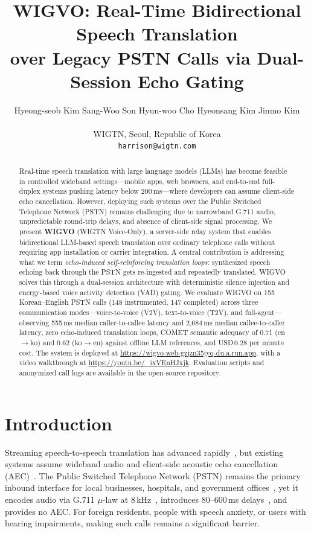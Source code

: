 \documentclass[11pt]{article}
\title{WIGVO: Real-Time Bidirectional Speech Translation\\over Legacy PSTN Calls via Dual-Session Echo Gating}
\author{
  Hyeong-seob Kim \quad
  Sang-Woo Son \quad
  Hyun-woo Cho \quad
  Hyeonsang Kim \quad
  Jinmo Kim \\
  \\
  WIGTN, Seoul, Republic of Korea \\
  \texttt{harrison@wigtn.com}
}
\begin{document}
\maketitle

\begin{abstract}
Real-time speech translation with large language models (LLMs) has become feasible in controlled wideband settings---mobile apps, web browsers, and end-to-end full-duplex systems pushing latency below 200\,ms---where developers can assume client-side echo cancellation. However, deploying such systems over the Public Switched Telephone Network (PSTN) remains challenging due to narrowband G.711 audio, unpredictable round-trip delays, and absence of client-side signal processing. We present \textbf{WIGVO} (WIGTN Voice-Only), a server-side relay system that enables bidirectional LLM-based speech translation over ordinary telephone calls without requiring app installation or carrier integration. A central contribution is addressing what we term \emph{echo-induced self-reinforcing translation loops}: synthesized speech echoing back through the PSTN gets re-ingested and repeatedly translated. WIGVO solves this through a dual-session architecture with deterministic silence injection and energy-based voice activity detection (VAD) gating. We evaluate WIGVO on 155 Korean--English PSTN calls (148 instrumented, 147 completed) across three communication modes---voice-to-voice (V2V), text-to-voice (T2V), and full-agent---observing 555\,ms median caller-to-callee latency and 2{,}684\,ms median callee-to-caller latency, zero echo-induced translation loops, COMET semantic adequacy of 0.71 (en$\rightarrow$ko) and 0.62 (ko$\rightarrow$en) against offline LLM references, and USD\,0.28 per minute cost. The system is deployed at \url{https://wigvo-web-gzjzn35jyq-du.a.run.app}, with a video walkthrough at \url{https://youtu.be/_ixVEnHJxjk}. Evaluation scripts and anonymized call logs are available in the open-source repository.
\end{abstract}

\section{Introduction}

Streaming speech-to-speech translation has advanced rapidly~\citep{seamless_streaming_2023,openai_realtime_api_2024}, but existing systems assume wideband audio and client-side acoustic echo cancellation (AEC)~\citep{itu_g168_2015}. The Public Switched Telephone Network (PSTN) remains the primary inbound interface for local businesses, hospitals, and government offices~\citep{itu_pstn_overview_2020}, yet it encodes audio via G.711 $\mu$-law at 8\,kHz~\citep{itu_g711_1988}, introduces 80--600\,ms delays~\citep{itu_g114_2003}, and provides no AEC. For foreign residents, people with speech anxiety, or users with hearing impairments, making such calls remains a significant barrier.
\end{document}
